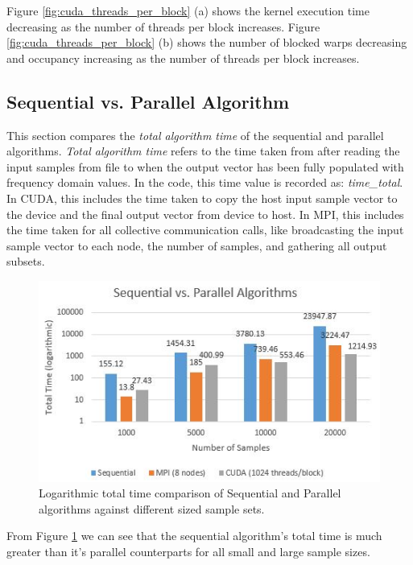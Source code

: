 \documentclass[11pt,a4paper]{article}
\begin{document}
Figure \ref{fig:cuda_threads_per_block} (a) shows the kernel execution time decreasing as the number of threads per block increases. Figure \ref{fig:cuda_threads_per_block} (b) shows the number of blocked warps decreasing and occupancy increasing as the number of threads per block increases.


\subsection{Sequential vs. Parallel Algorithm}\label{sect:seq_vs_par}
This section compares the \textit{total algorithm time} of the sequential and parallel algorithms. \textit{Total algorithm time} refers to the time taken from after reading the input samples from file to when the output vector has been fully populated with frequency domain values. In the code, this time value is recorded as: \textit{time\_total}. In CUDA, this includes the time taken to copy the host input sample vector to the device and the final output vector from device to host. In MPI, this includes the time taken for all collective communication calls, like broadcasting the input sample vector to each node, the number of samples, and gathering all output subsets.

\begin{figure}
\begin{center}
\includegraphics[scale=0.7]{seq_vs_par}
\end{center}
\caption{Logarithmic total time comparison of Sequential and Parallel algorithms against different sized sample sets.}
\label{fig:seq_vs_par}
\end{figure}

From Figure \ref{fig:seq_vs_par} we can see that the sequential algorithm's total time is much greater than it's parallel counterparts for all small and large sample sizes.
\end{document}
